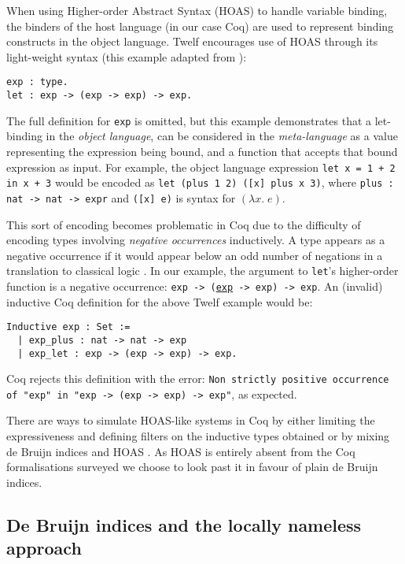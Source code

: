 \documentclass[]{unswthesis}
\let\c\texttt
\let\i\textit
\begin{document}
When using Higher-order Abstract Syntax (HOAS) to handle variable binding, the binders of the host language (in our case Coq) are used to represent binding constructs in the object language. Twelf encourages use of HOAS through its light-weight syntax (this example adapted from \cite{twelf08}):

\begin{verbatim}
exp : type.
let : exp -> (exp -> exp) -> exp.
\end{verbatim}

The full definition for \c{exp} is omitted, but this example demonstrates that a let-binding in the \i{object language}, can be considered in the \i{meta-language} as a value representing the expression being bound, and a function that accepts that bound expression as input. For example, the object language expression \c{let x = 1 + 2 in x + 3} would be encoded as \c{let (plus 1 2) ([x] plus x 3)}, where \c{plus : nat -> nat -> expr} and \c{([x] e)} is syntax for $(\lambda x. \; e)$.

This sort of encoding becomes problematic in Coq due to the difficulty of encoding types involving \i{negative occurrences} inductively. A type appears as a negative occurrence if it would appear below an odd number of negations in a translation to classical logic \cite{tapl}. In our example, the argument to \c{let}'s higher-order function is a negative occurrence: \c{exp -> (\underline{exp} -> exp) -> exp}. An (invalid) inductive Coq definition for the above Twelf example would be:

\begin{verbatim}
Inductive exp : Set :=
  | exp_plus : nat -> nat -> exp
  | exp_let : exp -> (exp -> exp) -> exp.
\end{verbatim}

Coq rejects this definition with the error: \c{Non strictly positive occurrence of "exp" in
 "exp -> (exp -> exp) -> exp"}, as expected.

There are ways to simulate HOAS-like systems in Coq by either limiting the expressiveness and defining filters on the inductive types obtained \cite{despeyroux95} or by mixing de Bruijn indices and HOAS \cite{capretta07}. As HOAS is entirely absent from the Coq formalisations surveyed we choose to look past it in favour of plain de Bruijn indices.

\subsection{De Bruijn indices and the locally nameless approach}
\label{sec:de_bruijn}
\end{document}
